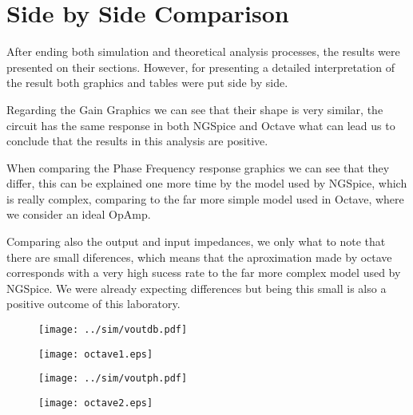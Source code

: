 \section{Side by Side Comparison}
\label{sec:comparison}
\par After ending both simulation and theoretical analysis processes, the results were presented on their sections. However, for presenting a detailed interpretation of the result both graphics and tables were put side by side.
\par Regarding the Gain Graphics we can see that their shape is very similar, the circuit has the same response in both NGSpice and Octave what can lead us to conclude that the results in this analysis are positive.\par
\par When comparing the Phase Frequency response graphics we can see that they differ, this can be explained one more time by the model used by NGSpice, which is really complex, comparing to the far more simple model used in Octave, where we consider an ideal OpAmp.
\par Comparing also the output and input impedances, we only what to note that there are small diferences, which means that the aproximation made by octave corresponds with a very high sucess rate to the far more complex model used by NGSpice. We were already expecting differences but being this small is also a positive outcome of this laboratory.

\begin{figure} [H]
\centering
\begin{minipage}{.5\textwidth}
  \centering
  \texttt{[image: ../sim/voutdb.pdf]}
  \label{fig:sim41}
\end{minipage}%
\begin{minipage}{.5\textwidth}
  \centering
  \texttt{[image: octave1.eps]}
  \label{fig:vout_env}
\end{minipage}
\end{figure}



\begin{figure} [H]
\centering
\begin{minipage}{.5\textwidth}
  \centering
  \texttt{[image: ../sim/voutph.pdf]}
  \label{fig:sim41}
\end{minipage}%
\begin{minipage}{.5\textwidth}
  \centering
  \texttt{[image: octave2.eps]}
  \label{fig:vout_env}
\end{minipage}
\end{figure}


